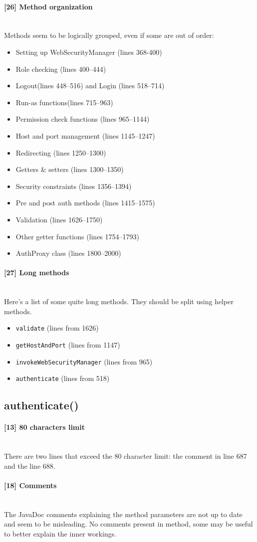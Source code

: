 \documentclass[a4paper, 11pt]{article}
\newcommand{\code}[1]{\texttt{#1}}
\newcommand{\issue}[3][?]{
    \paragraph{[#1] #2} \mbox{}\\ #3
}
\begin{document}
\issue[26]{Method organization} {
Methods seem to be logically grouped, even if some are out of order: 
\begin{itemize}
    \item Setting up WebSecurityManager (lines 368-400)
    \item Role checking (lines 400--444)
    \item Logout(lines 448--516) and Login (lines 518--714)
    \item Run-as functions(lines 715--963)
    \item Permission check functions (lines 965--1144)
    \item Host and port management (lines 1145--1247)
    \item Redirecting (lines 1250--1300)
    \item Getters \& setters (lines 1300--1350)
    \item Security constraints (lines 1356--1394)
    \item Pre and post auth methods (lines 1415--1575)
    \item Validation (lines 1626--1750)
    \item Other getter functions (lines 1754--1793)
    \item AuthProxy class (lines 1800--2000) 
\end{itemize}
}

\issue[27]{Long methods} {
    Here's a list of some quite long methods. 
    They should be split using helper methods.
    \begin{itemize} 
        \item \code{validate} (lines from 1626)
        \item \code{getHostAndPort} (lines from 1147)
        \item \code{invokeWebSecurityManager} (lines from 965)
        \item \code{authenticate} (lines from 518) 
    \end{itemize}
}

\subsection{authenticate()} %
\label{sub:auth}
\issue[13]{80 characters limit}{
    There are two lines that exceed the 80 character limit: the comment
    in line 687 and the line 688. 
}

\issue[18]{Comments} {
The JavaDoc comments explaining the method parameters are not up to date 
and seem to be misleading. No comments present in method, some may be useful 
to better explain the inner workings.
}
\end{document}
